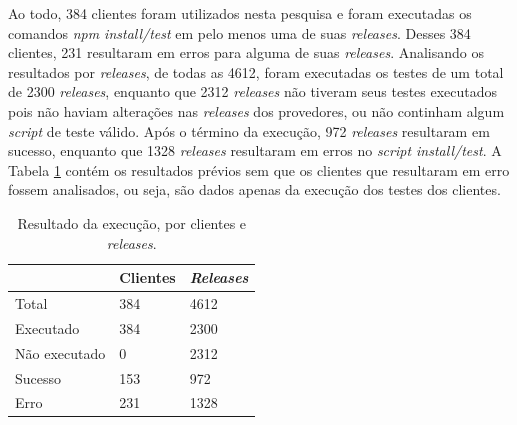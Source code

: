 

Ao todo, 384 clientes foram utilizados nesta pesquisa e foram executadas os comandos \textit{npm install/test} em pelo menos uma de suas \textit{releases}. Desses 384 clientes, 231 resultaram em erros para alguma de suas \textit{releases}. Analisando os resultados por \textit{releases}, de todas as 4612, foram executadas os testes de um total de 2300 \textit{releases}, enquanto que 2312 \textit{releases} não tiveram seus testes executados pois não haviam alterações nas \textit{releases} dos provedores, ou não continham algum \textit{script} de teste válido. Após o término da execução, 972 \textit{releases} resultaram em sucesso, enquanto que 1328 \textit{releases} resultaram em erros no \textit{script install/test}. A Tabela \ref{tab:res_rq1_1} contém os resultados prévios sem que os clientes que resultaram em erro fossem analisados, ou seja, são dados apenas da execução dos testes dos clientes.

\begin{table}[]
\centering
\begin{tabular}{|l|l|l|}
\hline
                    & Clientes & \textit{Releases} \\ \hline
    Total           & 384     & 4612     \\
    Executado       & 384     & 2300     \\
    Não executado   & 0       & 2312     \\
    Sucesso         & 153     & 972     \\
    Erro            & 231     & 1328     \\ \hline
\end{tabular}
\caption{Resultado da execução, por clientes e \textit{releases}.}
\label{tab:res_rq1_1}
\end{table}

